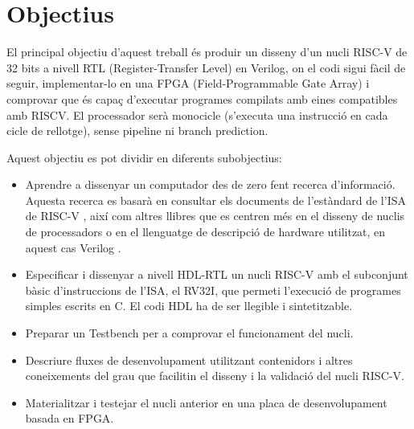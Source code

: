 \documentclass[10pt,a4paper,twocolumn,twoside]{article}
\begin{document}
\section{Objectius} 
\label{sec:Obj}
El principal objectiu d'aquest treball és produir un disseny d'un nucli RISC-V de 32 bits a nivell RTL (Register-Transfer Level) en Verilog, on el codi sigui fàcil de seguir, implementar-lo en una FPGA (Field-Programmable Gate Array) i comprovar que és capaç d’executar programes compilats amb eines compatibles amb RISCV. El processador serà monocicle (s'executa una instrucció en cada cicle de rellotge), sense pipeline ni branch prediction.

Aquest objectiu es pot dividir en diferents subobjectius:

\begin{itemize}

    \item Aprendre a dissenyar un computador des de zero fent recerca d'informació. Aquesta recerca es basarà en consultar els documents de l’estàndard de l'ISA de RISC-V \cite{waterman_volume_2019} \cite{waterman_volume_2019-1}, així com altres llibres que es centren més en el disseny de nuclis de processadors \cite{patterson_computer_2018} o en el llenguatge de descripció de hardware utilitzat, en aquest cas Verilog \cite{li_implementing_2018}.

    \item Especificar i dissenyar a nivell HDL-RTL un nucli RISC-V amb el subconjunt bàsic d'instruccions de l’ISA, el RV32I, que permeti l'execució de programes simples escrits en C. El codi HDL ha de ser llegible i sintetitzable.
    
    \item Preparar un Testbench per a comprovar el funcionament del nucli.
    
    \item Descriure fluxes de desenvolupament utilitzant contenidors i altres coneixements del grau que facilitin el disseny i la validació del nucli RISC-V.  
    
    \item Materialitzar i testejar el nucli anterior en una placa de desenvolupament basada en FPGA.
    
        
\end{itemize}
\end{document}
